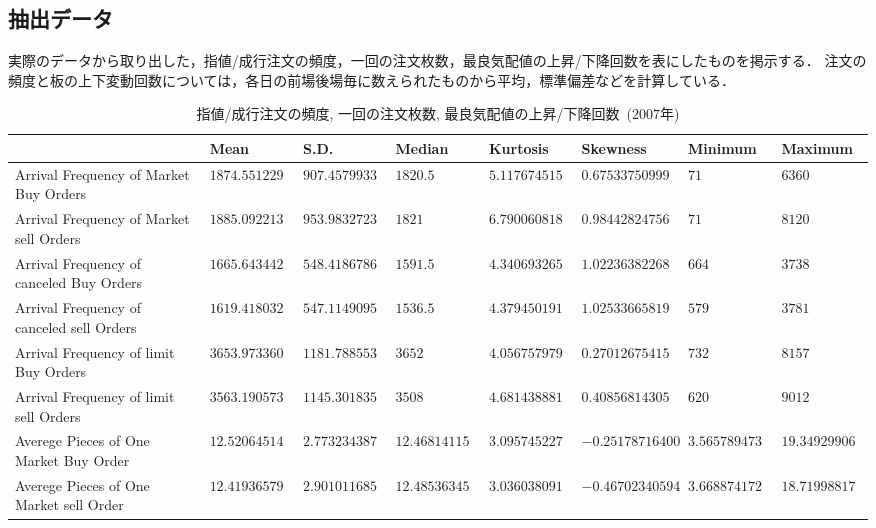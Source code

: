 \documentclass[a4j,papersize,disablejfam,slide,14pt]{jsarticle}
\newcommand{\bhline}[1]{\noalign {\hrule height #1}} %
\begin{document}
\subsection{抽出データ}
    実際のデータから取り出した，指値/成行注文の頻度，一回の注文枚数，最良気配値の上昇/下降回数を表にしたものを掲示する．
    注文の頻度と板の上下変動回数については，各日の前場後場毎に数えられたものから平均，標準偏差などを計算している．
    \begin{table}[H]
    	\centering
        \caption{指値/成行注文の頻度, 一回の注文枚数, 最良気配値の上昇/下降回数\ ($2007$年)}
        \fontsize{6pt}\selectfont
    	\begin{tabularx}{\linewidth}{l||lllllll} \bhline{1.5pt}
        \label{tb:statistics_parameters}
        	  & {\rm Mean} & {\rm S.D.} & {\rm Median} & {\rm Kurtosis} & {\rm Skewness} & {\rm Minimum} & {\rm Maximum} \\ \hline
			{\rm Arrival Frequency of Market Buy Orders} & $1874.5512295082$ & $907.457993347613$ & $1820.5$ & $5.11767451501856$ & $0.675337509991397$ & $71$ & $6360$ \\ \hline
			{\rm Arrival Frequency of Market sell Orders} & $1885.09221311475$ & $953.983272328056$ & $1821$ & $6.79006081829123$ & $0.984428247560377$ & $71$ & $8120$ \\ \hline
			{\rm Arrival Frequency of canceled Buy Orders} & $1665.64344262295$ & $548.418678697007$ & $1591.5$ & $4.34069326524823$ & $1.0223638226889$ & $664$ & $3738$ \\ \hline
			{\rm Arrival Frequency of canceled sell Orders} & $1619.41803278689$ & $547.114909569955$ & $1536.5$ & $4.37945019113223$ & $1.02533665819909$ & $579$ & $3781$ \\ \hline
			{\rm Arrival Frequency of limit Buy Orders} & $3653.97336065574$ & $1181.78855390768$ & $3652$ & $4.05675797950432$ & $0.270126754158371$ & $732$ & $8157$ \\ \hline
			{\rm Arrival Frequency of limit sell Orders} & $3563.19057377049$ & $1145.30183541394$ & $3508$ & $4.68143888199017$ & $0.408568143055593$ & $620$ & $9012$ \\ \hline
			{\rm Averege Pieces of One Market Buy Order} & $12.5206451488378$ & $2.77323438747951$ & $12.4681411546065$ & $3.09574522739222$ & $-0.251787164006476$ & $3.56578947368421$ & $19.3492990654206$ \\ \hline
			{\rm Averege Pieces of One Market sell Order} & $12.4193657939448$ & $2.9010116850716$ & $12.4853634546859$ & $3.03603809159898$ & $-0.467023405948823$ & $3.66887417218543$ & $18.7199881726789$ \\ \hline

\end{tabularx}
\end{table}
\end{document}
